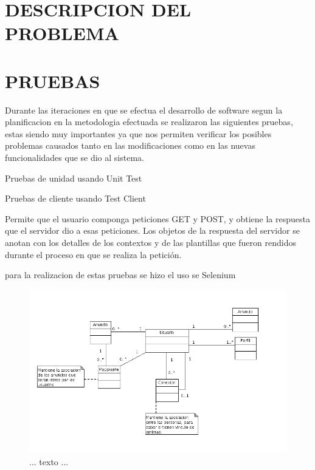 \section{DESCRIPCION DEL PROBLEMA}

\section{PRUEBAS}
Durante las iteraciones en que se efectua el desarrollo de software segun la planificacion en la metodologia efectuada se realizaron las siguientes pruebas, estas siendo muy importantes ya que nos permiten verificar los posibles problemas causados tanto en las modificaciones como en las nuevas funcionalidades que se dio al sistema.

Pruebas de unidad usando Unit Test

Pruebas de cliente usando Test Client

Permite que el usuario componga peticiones GET y POST, y obtiene la respuesta que el servidor dio a esas peticiones. Los objetos de la respuesta del servidor se anotan con los detalles de los contextos y de las plantillas que fueron rendidos durante el proceso en que se realiza la petición.

para la realizacion de estas pruebas se hizo el uso se Selenium 

\begin{figure}[htb]
\centering
\includegraphics[width=1\textwidth]{file.png}%
\caption{... texto ...}
\label{contexto:figura}
\end{figure}
%
